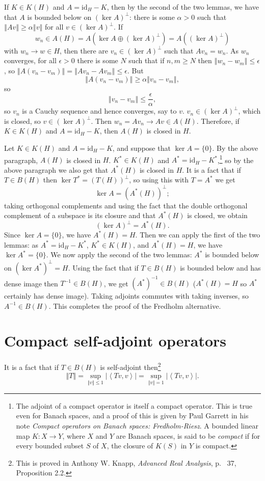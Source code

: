 \documentclass{article}
\newcommand{\inner}[2]{\left\langle #1, #2 \right\rangle}
\newcommand{\id}{\textrm{id}}
\newcommand{\norm}[1]{\left\Vert #1 \right\Vert}
\begin{document}
If $K \in K(H)$ and $A=\id_H - K$, then
by the second of the two lemmas, we have that $A$ is bounded below on $(\ker A)^\perp$: there is some $\alpha>0$ such that $\norm{Av} \geq \alpha \norm{v}$ for all
$v \in (\ker A)^\perp$. If
\[
w_n \in A(H) = A(\ker A \oplus (\ker A)^\perp) = A((\ker A)^\perp)
\]
with $w_n \to w \in H$, then there are $v_n \in (\ker A)^\perp$ such that $Av_n=w_n$. As $w_n$ converges, for all $\epsilon>0$ there is some $N$ such that
if $n,m \geq N$ then $\norm{w_n-w_m} \leq \epsilon$, so $\norm{A(v_n-v_m)}=\norm{Av_n-Av_m} \leq \epsilon$. But
\[
\norm{A(v_n-v_m)} \geq \alpha \norm{v_n-v_m},
\]
so
\[
\norm{v_n-v_m} \leq \frac{\epsilon}{\alpha},
\]
so $v_n$ is a Cauchy sequence and hence converges, say to $v$. $v_n \in (\ker A)^\perp$, which is closed, so $v \in (\ker A)^\perp$. Then $w_n = Av_n \to Av \in A(H)$. Therefore, if $K \in K(H)$ and $A=\id_H -K$, then $A(H)$ is closed in $H$.

Let $K \in K(H)$ and $A=\id_H - K$, and suppose that $\ker A = \{0\}$. By the above paragraph, $A(H)$ is closed in $H$. $K^* \in K(H)$ and $A^*=\id_H - K^*$,\footnote{The
adjoint of a compact operator is itself a compact operator. This is true even for Banach spaces, and a proof of this is given by
Paul Garrett in his note {\em Compact operators on Banach spaces: Fredholm-Riesz}.
A bounded linear map $K:X  \to Y$, where $X$ and $Y$ are Banach spaces, is said to be {\em compact}
if for every bounded subset $S$ of $X$, the closure of $K(S)$ in $Y$ is  compact.}
so by the above
paragraph we also get that $A^*(H)$ is closed in $H$. It is a fact that if $T \in B(H)$ then $\ker T^* = (T(H))^\perp$, so using this with $T=A^*$ we get
\[
\ker A = (A^*(H))^\perp;
\]
 taking orthogonal complements and using the fact that the double orthogonal complement of a subspace is its closure and that
 $A^*(H)$ is closed, we obtain
\[
(\ker A)^\perp = A^*(H).
\]
Since $\ker A=\{0\}$, we have $A^*(H)=H$. Then we can apply the first of the two lemmas: as $A^*=\id_H - K^*$, $K^* \in K(H)$, and $A^*(H)=H$, we have
$\ker A^*=\{0\}$. 
We now apply the second of the two lemmas: $A^*$ is bounded below on $(\ker A^*)^\perp=H$. Using the fact that if $T \in B(H)$ is bounded below and has dense image then
$T^{-1} \in B(H)$, we get $(A^*)^{-1} \in B(H)$ ($A^*(H)=H$ so $A^*$ certainly has dense image). Taking adjoints commutes with taking inverses,
so $A^{-1} \in B(H)$. This completes the proof of the Fredholm alternative.



\section{Compact self-adjoint operators}
It is a fact that
if $T \in B(H)$ is self-adjoint then\footnote{This is proved in Anthony W. Knapp, {\em Advanced Real Analysis},
p. ~37, Proposition 2.2.}
\[
\norm{T}=\sup_{\norm{v} \leq 1} |\inner{Tv}{v}| = \sup_{\norm{v}=1} |\inner{Tv}{v}|.
\]
\end{document}
